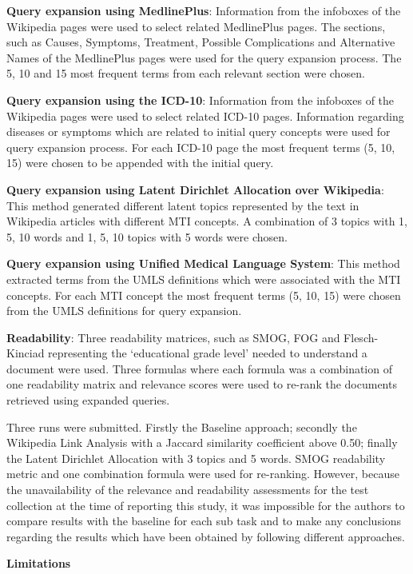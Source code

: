 \documentclass[]{article}
\begin{document}
\textbf{Query expansion using MedlinePlus}: Information from the infoboxes of the Wikipedia pages were used to select related MedlinePlus pages. The sections, such as Causes, Symptoms, Treatment, Possible Complications and Alternative Names of the MedlinePlus pages were used for the query expansion process. The 5, 10 and 15 most frequent terms from each relevant section were chosen.       

\textbf{Query expansion using the ICD-10}: Information from the infoboxes of the Wikipedia pages were used to select related ICD-10 pages. Information regarding diseases or symptoms which are related to initial query concepts were used for query expansion process. For each ICD-10 page the most frequent terms (5, 10, 15) were chosen to be appended with the initial query.
 
\textbf{Query expansion using Latent Dirichlet Allocation over Wikipedia}: This method generated different latent topics represented by the text in Wikipedia articles with different MTI concepts. A combination of 3 topics with 1, 5, 10 words and 1, 5, 10 topics with 5 words were chosen.     

\textbf{Query expansion using Unified Medical Language System}: This method extracted terms from the UMLS definitions which were associated with the MTI concepts. For each MTI concept the most frequent terms (5, 10, 15) were chosen from the UMLS definitions for query expansion.  

\textbf{Readability}: Three readability matrices, such as SMOG, FOG and Flesch-Kinciad representing the ‘educational grade level’ needed to understand a document were used. Three formulas where each formula was a combination of one readability matrix and relevance scores were used to re-rank the documents retrieved using expanded queries. 

Three runs were submitted. Firstly the Baseline approach; secondly the Wikipedia Link Analysis with a Jaccard similarity coefficient above 0.50; finally the Latent Dirichlet Allocation with 3 topics and 5 words. SMOG readability metric and one combination formula were used for re-ranking. However, because the unavailability of the relevance and readability assessments for the test collection at the time of reporting this study, it was impossible for the authors to compare results with the baseline for each sub task and to make any conclusions regarding the results which have been obtained by following different approaches.            

\textbf{Limitations}
\end{document}
